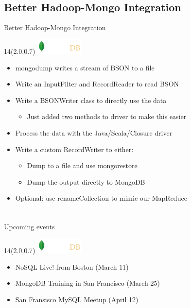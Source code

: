 \documentclass{beamer}
\newcommand{\MongoLogo}{
\begin{textblock}{14}(2.0,0.7)
  \includegraphics[height=0.8cm]{logo-mongodb-ondark.png}
\end{textblock}
}
\begin{document}
\subsection{Better Hadoop-Mongo Integration}
\begin{frame} {Better Hadoop-Mongo Integration}
  \MongoLogo

  \begin{itemize}
    \item mongodump writes a stream of BSON to a file
    \item Write an InputFilter and RecordReader to read BSON
    \item Write a BSONWriter class to directly use the data
      \begin{itemize}
        \item Just added two methods to driver to make this easier
      \end{itemize}
    \item Process the data with the Java/Scala/Closure driver
    \item Write a custom RecordWriter to either:
      \begin{itemize}
        \item Dump to a file and use mongorestore
        \item Dump the output directly to MongoDB
      \end{itemize}
    \item Optional: use renameCollection to mimic our MapReduce
  \end{itemize}

\end{frame}

\section{}

\begin{frame}{Upcoming events}{}
  \MongoLogo

  \begin{itemize}
    \item NoSQL Live! from Boston (March 11)
    \item MongoDB Training in San Francisco (March 25)
    \item San Fransisco MySQL Meetup (April 12)
  \end{itemize}
\end{frame}
\end{document}
